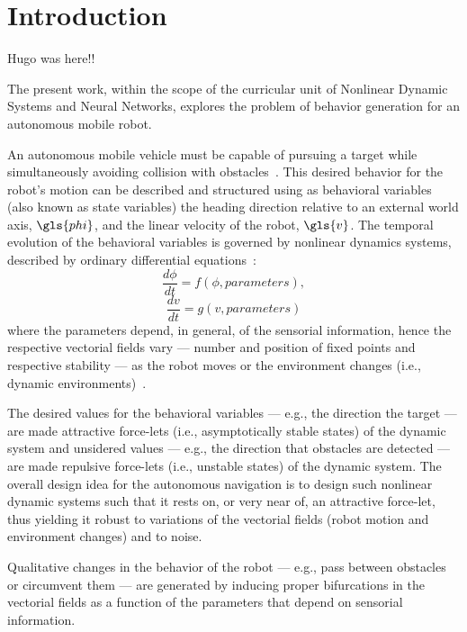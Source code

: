 %
%
%
\chapter{Introduction}%
\label{ch:introduction}
Hugo was here!!

The present work, within the scope of the curricular unit of Nonlinear Dynamic
Systems and Neural Networks, explores the problem of behavior generation for an
autonomous mobile robot.

An autonomous mobile vehicle must be capable of pursuing a target while
simultaneously avoiding collision with obstacles~\cite{bicho2000dynamic}. This
desired behavior for the robot's motion can be described and structured using
as behavioral variables (also known as state variables) the heading direction
relative to an external world axis, $\gls{phi}$, and the linear velocity of the
robot, $\gls{v}$. The temporal evolution of the behavioral variables is governed by
nonlinear dynamics systems, described by ordinary differential equations~\cite{bicho2000dynamic}:
%
\begin{equation}
  \label{eq:1}
  \frac{d \phi}{dt} = f (\phi{,} parameters),
\end{equation}
%
\begin{equation}
  \label{eq:2}
\frac{dv}{dt} = g (v{,}parameters)
\end{equation}
%
where the parameters depend, in general, of the sensorial information, hence the
respective vectorial fields vary --- number and position of fixed points and
respective stability --- as the robot moves or the environment changes (i.e.,
dynamic environments)~\cite{bicho2000dynamic}.

The desired values for the behavioral variables --- e.g., the direction the
target --- are made attractive force-lets (i.e., asymptotically stable states) of the
dynamic system and unsidered values --- e.g., the direction that obstacles are
detected --- are made repulsive force-lets (i.e., unstable states) of the
dynamic system. The overall design idea for the autonomous navigation is to
design such nonlinear dynamic systems such that it rests on, or very near of, an
attractive force-let, thus yielding it robust to variations of the vectorial
fields (robot motion and environment changes) and to noise.

Qualitative changes in the behavior of the robot --- e.g., pass between
obstacles or circumvent them --- are generated by inducing proper bifurcations
in the vectorial fields as a function of the parameters that depend on sensorial
information.

